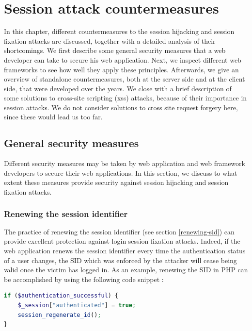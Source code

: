 \chapter{Session attack countermeasures}

In this chapter, different countermeasures to the \gls{session hijacking} and \gls{session fixation} attacks are discussed, together with a detailed analysis of their shortcomings. We first describe some general security measures that a web developer can take to secure his web application. Next, we inspect different web frameworks to see how well they apply these principles. Afterwards, we give an overview of standalone countermeasures, both at the server side and at the client side, that were developed over the years. We close with a brief description of some solutions to cross-site scripting (\gls{xss}) attacks, because of their importance in session attacks. We do not consider solutions to cross site request forgery here, since these would lead us too far.

\section{General security measures}\label{general-security}

Different security measures may be taken by web application and web framework developers to secure their web applications. In this section, we discuss to what extent these measures provide security against session hijacking and session fixation attacks.

\subsection{Renewing the session identifier}\label{renewing}

The practice of renewing the session identifier (see section \ref{renewing-sid}) can provide excellent protection against \gls{login session fixation} attacks. Indeed, if the web application renews the session identifier every time the authentication status of a user changes, the SID which was enforced by the attacker will cease being valid once the victim has logged in. As an example, renewing the SID in PHP can be accomplished by using the following code snippet \cite{PHPregenerate,Johns2011}:

\begin{lstlisting}[language=PHP]
if ($authentication_successful) {
    $_session["authenticated"] = true;
    session_regenerate_id();
}
\end{lstlisting}

